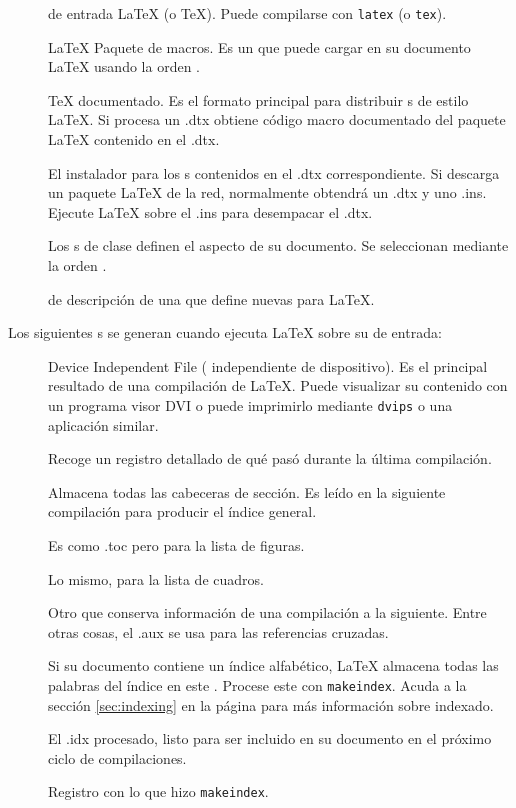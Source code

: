 \begin{description}  
  \item[] \Filenomo{} de entrada \LaTeX{} (o \TeX{}).  Puede  compilarse con \texttt{latex} (o \texttt{tex}).
  \item[] \LaTeX{} Paquete de macros.  Es un \filenomo{} que puede  cargar en su documento \LaTeX{} usando la orden .
  \item[] \TeX{} documentado.  Es el formato principal para distribuir \filenomo{}s de estilo \LaTeX{}.  Si procesa un \filenomo{} .dtx obtiene código macro documentado del paquete \LaTeX{} contenido en el \filenomo{} .dtx.
  \item[] El instalador para los \filenomo{}s contenidos en el \filenomo{} .dtx correspondiente.  Si descarga un paquete \LaTeX{} de la red, normalmente obtendrá un \filenomo{} .dtx y uno .ins.  Ejecute \LaTeX{} sobre el \filenomo{} .ins para desempacar el \filenomo{} .dtx.
  \item[] Los \filenomo{}s de clase definen el aspecto de su  documento.  Se seleccionan mediante la orden .
  \item[] \Filenomo{} de descripción de una \fontnomo{} que define  nuevas \fontsnomo{} para \LaTeX{}.
\end{description}

Los siguientes \filenomo{}s se generan cuando ejecuta \LaTeX{} sobre su \filenomo{} de entrada:

\begin{description}
  \item[] Device Independent File (\filenomo{} independiente de dispositivo).  Es el principal resultado de una compilación de \LaTeX{}.  Puede visualizar su contenido con un programa visor DVI o puede imprimirlo mediante \texttt{dvips} o una aplicación similar.
  \item[] Recoge un registro detallado de qué pasó durante la  última compilación.
  \item[] Almacena todas las cabeceras de sección.  Es leído  en la siguiente compilación para producir el índice general.
  \item[] Es como .toc pero para la lista de figuras.
  \item[] Lo mismo, para la lista de cuadros.
  \item[] Otro \filenomo{} que conserva información de una compilación a la siguiente.  Entre otras cosas, el \filenomo{} .aux se usa para las referencias cruzadas.
  \item[] Si su documento contiene un índice alfabético, \LaTeX{} almacena todas las palabras del índice en este \filenomo{}. Procese este \filenomo{} con \texttt{makeindex}.  Acuda a la sección \ref{sec:indexing} en la página \pageref{sec:indexing} para más información sobre indexado.
  \item[] El \filenomo{} .idx procesado, listo para ser incluido  en su documento en el próximo ciclo de compilaciones.
  \item[] Registro con lo que hizo \texttt{makeindex}.
\end{description}

